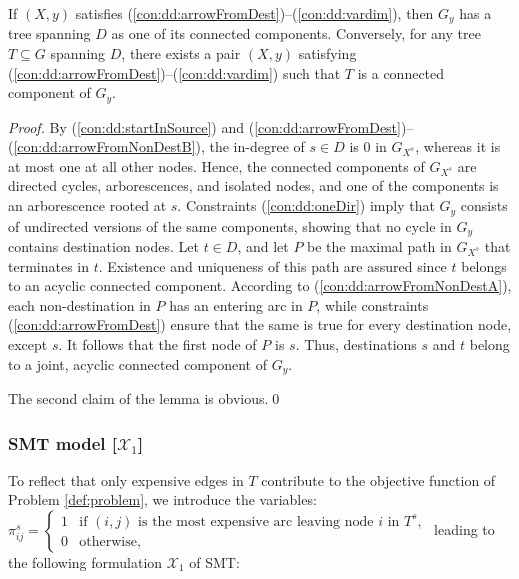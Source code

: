 \begin{lemma} \label{lem:x0valid}
If $(X,y)$ satisfies (\ref{con:dd:arrowFromDest})--(\ref{con:dd:vardim}), then $G_y$ has a tree spanning $D$ as one of its connected components.
Conversely, for any tree $T\subseteq G$ spanning $D$, there exists a pair $(X,y)$ satisfying (\ref{con:dd:arrowFromDest})--(\ref{con:dd:vardim}) such that $T$
is a connected component of $G_y$.
\end{lemma}
\begin{proof}
By (\ref{con:dd:startInSource}) and (\ref{con:dd:arrowFromDest})--(\ref{con:dd:arrowFromNonDestB}),
the in-degree of $s\in D$ is 0 in $G_{X^s}$, whereas it is at most one at all other nodes.
Hence, the connected components of $G_{X^s}$ are directed cycles, arborescences, and isolated nodes,
and one of the components is an arborescence rooted at $s$.
Constraints (\ref{con:dd:oneDir}) imply that $G_y$ consists of undirected versions of the same components,
showing that no cycle in $G_y$ contains destination nodes.
Let $t\in D$, and let $P$
be the maximal path in $G_{X^s}$ that terminates in $t$.
Existence and uniqueness of this path are assured since $t$ belongs to an acyclic connected component.
According to (\ref{con:dd:arrowFromNonDestA}), each non-destination in $P$ has an entering arc in $P$,
while constraints (\ref{con:dd:arrowFromDest}) ensure that the same is true for every destination node, except $s$.
It follows that the first node of $P$ is $s$.
Thus, destinations $s$ and $t$ belong to a joint, acyclic connected component of $G_y$.

The second claim of the lemma is obvious.\qed
\end{proof}


\subsubsection{SMT model [$\mathcal{X}_1$]} \label{sec:x1}

To reflect that only expensive edges in $T$ contribute to the objective function of Problem \ref{def:problem}, we introduce the variables:
\newline\newline
$\pi^s_{ij}=
\begin{cases}
    1 & \text{if $(i,j)$ is the most expensive arc leaving node $i$ in $T^s$},\\
    0 & \text{otherwise},
  \end{cases}$
\newline\newline
leading to the following formulation $\mathcal{X}_1$ of SMT:

